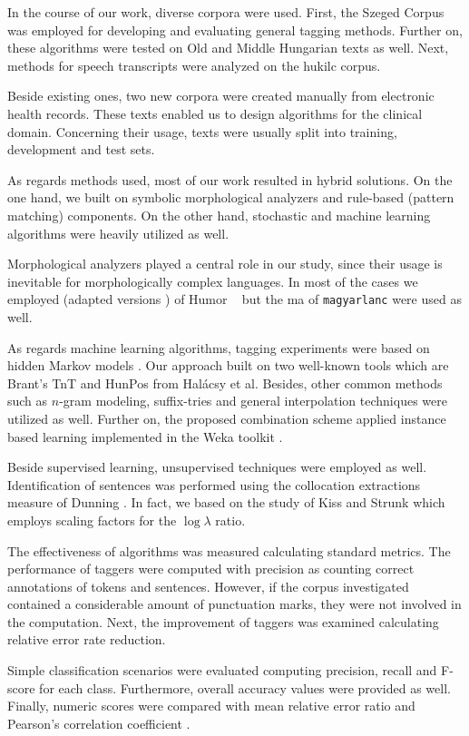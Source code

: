 In the course of our work, diverse corpora were used. 
First, the Szeged Corpus \cite{Csendes2004} was employed for developing and evaluating general tagging methods.
Further on, these algorithms were tested on Old and Middle Hungarian \cite{Novak2013} texts as well.
Next, methods for speech transcripts were analyzed on the \acrshort{hukilc} corpus\cite{Matyus2014}.

Beside existing ones, two new corpora were created manually from electronic health records.
These texts enabled us to design algorithms for the clinical domain.
Concerning their usage, texts were usually split into training, development and test sets.

As regards methods used, most of our work resulted in hybrid solutions.
On the one hand, we built on symbolic morphological analyzers and rule-based (pattern matching) components. 
On the other hand, stochastic and machine learning algorithms were heavily utilized as well.

Morphological analyzers played a central role in our study, since their usage is inevitable for morphologically complex languages.
In most of the cases we employed (adapted versions \cite{Novak2013,NovakOMK,Orosz2013}) of Humor ~\cite{Proszeky1994,Novak2003,Proszeky2005} but the \acrshort{ma} of \texttt{magyarlanc} \cite{zsibrata2013magyarlanc} were used as well.

As regards machine learning algorithms, tagging experiments were based on hidden Markov models \cite{Rabiner1989,Samuelsson1993}. 
Our approach built on two well-known tools which are Brant's TnT \cite{Brants2000} and HunPos \cite{Halacsy2007} from Halácsy et al. 
Besides, other common methods such as $n$-gram modeling, suffix-tries and general interpolation techniques were utilized as well.
Further on, the proposed combination scheme applied instance based learning \cite{Aha1991} implemented in the Weka toolkit \cite{Hall2009}.

Beside supervised learning, unsupervised techniques were employed as well.
Identification of sentences was performed using the collocation extractions measure of Dunning \cite{dunning1993accurate}.
In fact, we based on the study of Kiss and Strunk \cite{kiss2006unsupervised} which employs scaling factors for the $\log\lambda$ ratio.

The effectiveness of algorithms was measured calculating standard metrics.
The performance of taggers were computed with precision as counting correct annotations of tokens and sentences.
However, if the corpus investigated contained a considerable amount of punctuation marks, they were not involved in the computation.
Next, the improvement of taggers was examined calculating relative error rate reduction. 

Simple classification scenarios were evaluated computing precision, recall and F-score for each class.
Furthermore, overall accuracy values were provided as well.
Finally, numeric scores were compared with mean relative error \cite{Witten2011} ratio and Pearson's correlation coefficient \cite{Witten2011}.